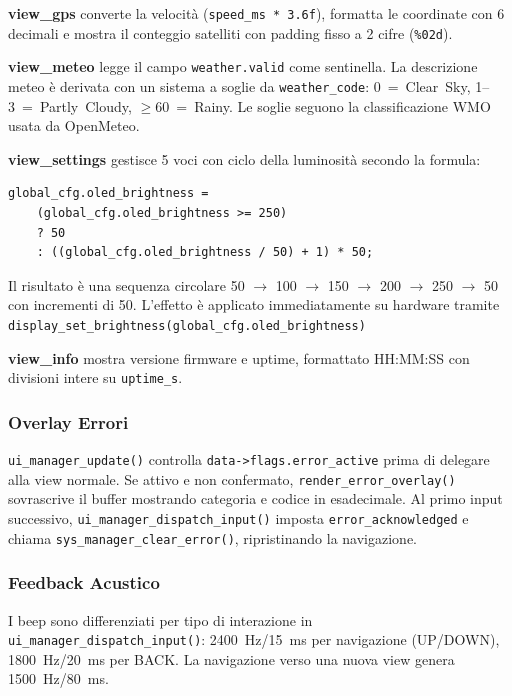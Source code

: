 \textbf{view\_gps} converte la velocità (\texttt{speed\_ms * 3.6f}),
formatta le coordinate con 6 decimali e mostra il conteggio satelliti con
padding fisso a 2 cifre (\texttt{\%02d}).

\textbf{view\_meteo} legge il campo \texttt{weather.valid} come sentinella.
La descrizione meteo è derivata con un sistema a soglie da \texttt{weather\_code}:
0~=~Clear~Sky, 1--3~=~Partly~Cloudy, $\geq$60~=~Rainy. Le soglie seguono
la classificazione WMO usata da OpenMeteo.

\textbf{view\_settings} gestisce 5 voci con ciclo della luminosità
secondo la formula:
\begin{lstlisting}
global_cfg.oled_brightness =
    (global_cfg.oled_brightness >= 250)
    ? 50
    : ((global_cfg.oled_brightness / 50) + 1) * 50;
\end{lstlisting}
Il risultato è una sequenza circolare 50 $\to$ 100 $\to$ 150 $\to$ 200
$\to$ 250 $\to$ 50 con incrementi di 50. L'effetto è applicato
immediatamente su hardware tramite
\texttt{display\_set\_brightness(global\_cfg.oled\_brightness)}

\textbf{view\_info} mostra versione firmware e uptime, formattato HH:MM:SS con divisioni intere su \texttt{uptime\_s}.

\subsubsection*{Overlay Errori}

\texttt{ui\_manager\_update()} controlla \texttt{data->flags.error\_active}
prima di delegare alla view normale. Se attivo e non confermato,
\texttt{render\_error\_overlay()} sovrascrive il buffer mostrando categoria
e codice in esadecimale. Al primo input successivo,
\texttt{ui\_manager\_dispatch\_input()} imposta \texttt{error\_acknowledged}
e chiama \texttt{sys\_manager\_clear\_error()}, ripristinando la navigazione.


\subsubsection*{Feedback Acustico}

I beep sono differenziati per tipo di interazione in
\texttt{ui\_manager\_dispatch\_input()}: 2400~Hz/15~ms per navigazione
(UP/DOWN), 1800~Hz/20~ms per BACK. La navigazione verso una nuova view
genera 1500~Hz/80~ms. 
 
